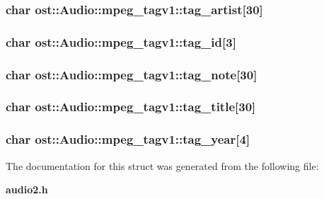 \subsubsection[{tag\_\-artist}]{\setlength{\rightskip}{0pt plus 5cm}char {\bf ost::Audio::mpeg\_\-tagv1::tag\_\-artist}[30]}\label{structost_1_1_audio_1_1mpeg__tagv1_aaec2a7c165378db68d95840e63640e4c}
\subsubsection[{tag\_\-id}]{\setlength{\rightskip}{0pt plus 5cm}char {\bf ost::Audio::mpeg\_\-tagv1::tag\_\-id}[3]}\label{structost_1_1_audio_1_1mpeg__tagv1_ae9fe8188284d7aa1307570dac5e46475}
\subsubsection[{tag\_\-note}]{\setlength{\rightskip}{0pt plus 5cm}char {\bf ost::Audio::mpeg\_\-tagv1::tag\_\-note}[30]}\label{structost_1_1_audio_1_1mpeg__tagv1_ad5f2e78c6836abb8231b35dd709c4bba}
\subsubsection[{tag\_\-title}]{\setlength{\rightskip}{0pt plus 5cm}char {\bf ost::Audio::mpeg\_\-tagv1::tag\_\-title}[30]}\label{structost_1_1_audio_1_1mpeg__tagv1_adfa7e43219245b81587495f2b8b13c4c}
\subsubsection[{tag\_\-year}]{\setlength{\rightskip}{0pt plus 5cm}char {\bf ost::Audio::mpeg\_\-tagv1::tag\_\-year}[4]}\label{structost_1_1_audio_1_1mpeg__tagv1_a8fa333a7e97cf9b4e4750b47fc86f6d7}


The documentation for this struct was generated from the following file:\begin{DoxyCompactItemize}
\item 
{\bf audio2.h}\end{DoxyCompactItemize}

